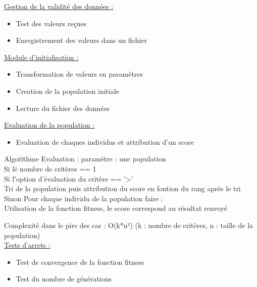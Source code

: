 \documentclass[a4paper,11pt]{article}
\begin{document}
		\underline{Gestion de la validité des données : }
		\begin{itemize}
			\item Test des valeurs reçues
			\item Enregistrement des valeurs dans un fichier\\
		\end{itemize}
		
		\underline{Module d'initialisation : }
		\begin{itemize}
			\item Transformation de valeurs en paramètres
			\item Creation de la population initiale
			\item Lecture du fichier des données\\
		\end{itemize}
	
		\underline{Evaluation de la population : }
		\begin{itemize}
			\item Evaluation de chaques individus et attribution d'un score
		\end{itemize}
		\begin{tabbing} 
		Algo\=rithme Evaluation : paramètre : une population\\
			\>Si l\=e nombre de critères == 1\\
			\>	\>Si l\='option d'évaluation du critère == '>'\\
			\>	\>	\>Tri de la population puis attribution du score en fontion du rang après le tri\\
			\>Sinon
			\>	\>Pour chaque individu de la population faire :\\
			\>	\>	\>Utilisation de la fonction fitness, le score correspond au résultat renvoyé
		\end{tabbing}
		Complexité dans le pire des cas : O(k*n²) (k : nombre de critères, n : taille de la population)\\
		
		\underline{Tests d'arrets : }
		\begin{itemize}
			\item Test de convergence de la fonction fitness
			\item Test du nombre de générations\\
		\end{itemize}
\end{document}
